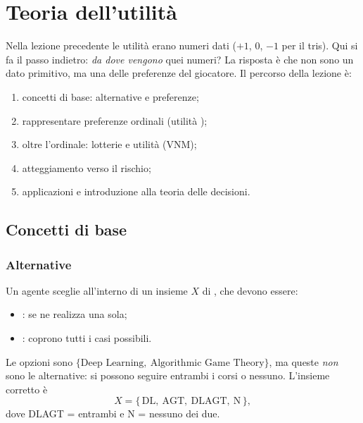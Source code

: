\chapter{Teoria dell'utilità}

\parteteoria

Nella lezione precedente le utilità erano numeri dati ($+1$, $0$, $-1$ per il tris).
Qui si fa il passo indietro: \emph{da dove vengono} quei numeri? La risposta è che
non sono un dato primitivo, ma una  delle preferenze del giocatore.
Il percorso della lezione è:
\begin{enumerate}[label=\arabic*.]
  \item concetti di base: alternative e preferenze;
  \item rappresentare preferenze ordinali (utilità );
  \item oltre l'ordinale: lotterie e utilità  (VNM);
  \item atteggiamento verso il rischio;
  \item applicazioni e introduzione alla teoria delle decisioni.
\end{enumerate}

\section{Concetti di base}

\subsection{Alternative}

Un agente sceglie all'interno di un insieme $X$ di , che devono essere:
\begin{itemize}
  \item {}: se ne realizza una sola;
  \item {}: coprono tutti i casi possibili.
\end{itemize}

\begin{esempio}
Le opzioni sono $\{\text{Deep Learning},\ \text{Algorithmic Game Theory}\}$, ma queste
\emph{non} sono le alternative: si possono seguire entrambi i corsi o nessuno.
L'insieme corretto è
\[
  X = \{\, \mathrm{DL},\ \mathrm{AGT},\ \mathrm{DLAGT},\ \mathrm{N} \,\},
\]
dove DLAGT = entrambi e N = nessuno dei due.
\end{esempio}

